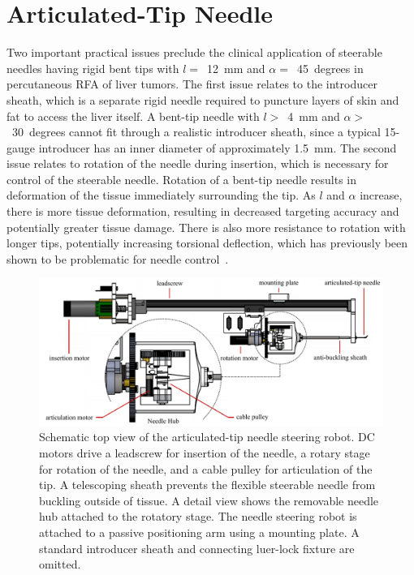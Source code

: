 \section{Articulated-Tip Needle}
\label{sec:Articulated-TipNeedle}
Two important practical issues preclude the clinical application of steerable needles having rigid bent tips with $l =$~12~mm and $\alpha =$~45~degrees in percutaneous RFA of liver tumors. The first issue relates to the introducer sheath, which is a separate rigid needle required to puncture layers of skin and fat to access the liver itself. A bent-tip needle with $l >$~4~mm and $\alpha >$~30~degrees cannot fit through a realistic introducer sheath, since a typical 15-gauge introducer has an inner diameter of approximately 1.5~mm. The second issue relates to rotation of the needle during insertion, which is necessary for control of the steerable needle. Rotation of a bent-tip needle results in deformation of the tissue immediately surrounding the tip. As $l$ and $\alpha$ increase, there is more tissue deformation, resulting in decreased targeting accuracy and potentially greater tissue damage. There is also more resistance to rotation with longer tips, potentially increasing torsional deflection, which has previously been shown to be problematic for needle control~\cite{Reed2009}.

\begin{figure}[!t]
\centering
\includegraphics[width=\textwidth]{Images/Chapter3/NS2Robot/NS2Robot}
\caption[Top view of the articulated-tip robot]{Schematic top view of the articulated-tip needle steering robot. DC motors drive a leadscrew for insertion of the needle, a rotary stage for rotation of the needle, and a cable pulley for articulation of the tip. A telescoping sheath prevents the flexible steerable needle from buckling outside of tissue. A detail view shows the removable needle hub attached to the rotatory stage. The needle steering robot is attached to a passive positioning arm using a mounting plate. A standard introducer sheath and connecting luer-lock fixture are omitted.}
\label{fig:NS2Robot}
\end{figure}

